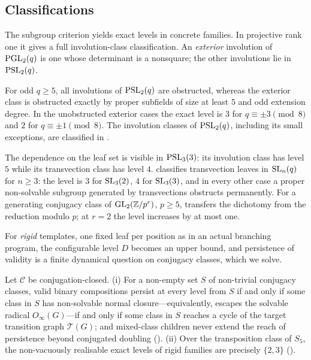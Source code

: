 \subsection*{Classifications}
The subgroup criterion yields exact levels in concrete families. In
projective rank one it gives a full involution-class classification. An
\emph{exterior} involution of $\operatorname{PGL}_2(q)$ is one whose determinant is a
nonsquare; the other involutions lie in $\operatorname{PSL}_2(q)$.

\begin{lettertheorem}
\label{ithm:D}
For odd $q\ge5$, all involutions of $\operatorname{PSL}_2(q)$ are obstructed, whereas the
exterior class is obstructed exactly by proper subfields of size at least $5$
and odd extension degree. In the unobstructed exterior cases the exact level
is $3$ for $q\equiv\pm3\pmod8$ and $2$ for $q\equiv\pm1\pmod8$.
The involution classes of $\operatorname{PSL}_2(q)$, including its small exceptions, are
classified in .
\end{lettertheorem}

The dependence on the leaf set is visible in $\operatorname{PSL}_3(3)$: its involution
class has level $5$ while its transvection class has level $4$.
 classifies transvection leaves in
$\operatorname{SL}_n(q)$ for $n\ge3$: the level is $3$ for $\operatorname{SL}_3(2)$, $4$ for
$\operatorname{SL}_3(3)$, and in every other case a proper non-solvable subgroup
generated by transvections obstructs permanently. For a generating
conjugacy class of $\operatorname{GL}_2(\mathbb{Z}/p^r)$, $p\ge5$, 
transfers the dichotomy from the reduction modulo $p$; at $r=2$ the level
increases by at most one.

For \emph{rigid} templates, one fixed leaf per position as in an actual
branching program, the configurable level $D$ becomes an upper bound, and
persistence of validity is a finite dynamical question on conjugacy
classes, which we solve.

\begin{lettertheorem}
\label{ithm:C}
Let $\mathcal{C}$ be conjugation-closed.
\textup{(i)} For a non-empty set $S$ of non-trivial conjugacy classes, valid binary
compositions persist at every level from $S$ if and only if some class in $S$ has
non-solvable normal closure---equivalently, escapes the solvable radical
$O_\infty(G)$---if and only if some class in $S$ reaches a cycle of the target transition
graph $\mathcal{T}(G)$; and mixed-class children never extend the reach of persistence
beyond conjugated doubling \textup{()}.
\textup{(ii)} Over the transposition class of $S_5$, the non-vacuously realisable exact
levels of rigid families are precisely $\{2,3\}$ \textup{()}.
\end{lettertheorem}

